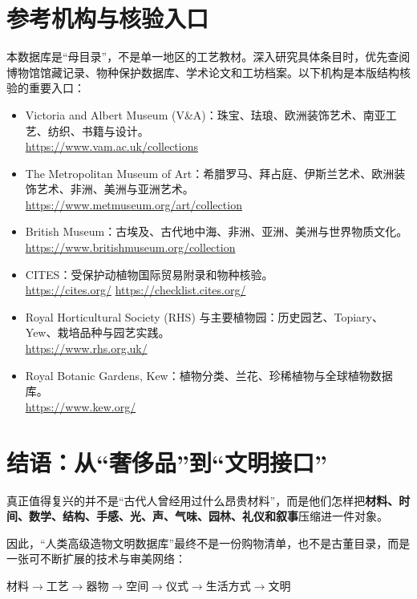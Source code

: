 \documentclass[lang=en,a4paper,11pt]{elegantpaper}
\begin{document}
\section{参考机构与核验入口}



本数据库是“母目录”，不是单一地区的工艺教材。深入研究具体条目时，优先查阅博物馆馆藏记录、物种保护数据库、学术论文和工坊档案。以下机构是本版结构核验的重要入口：
\begin{itemize}
\item Victoria and Albert Museum (V\&A)：珠宝、珐琅、欧洲装饰艺术、南亚工艺、纺织、书籍与设计。\\
\url{https://www.vam.ac.uk/collections}
\item The Metropolitan Museum of Art：希腊罗马、拜占庭、伊斯兰艺术、欧洲装饰艺术、非洲、美洲与亚洲艺术。\\
\url{https://www.metmuseum.org/art/collection}
\item British Museum：古埃及、古代地中海、非洲、亚洲、美洲与世界物质文化。\\
\url{https://www.britishmuseum.org/collection}
\item CITES：受保护动植物国际贸易附录和物种核验。\\
\url{https://cites.org/} \quad \url{https://checklist.cites.org/}
\item Royal Horticultural Society (RHS) 与主要植物园：历史园艺、Topiary、Yew、栽培品种与园艺实践。\\
\url{https://www.rhs.org.uk/}
\item Royal Botanic Gardens, Kew：植物分类、兰花、珍稀植物与全球植物数据库。\\
\url{https://www.kew.org/}
\end{itemize}

\section{结语：从“奢侈品”到“文明接口”}



真正值得复兴的并不是“古代人曾经用过什么昂贵材料”，而是他们怎样把\textbf{材料、时间、数学、结构、手感、光、声、气味、园林、礼仪和叙事}压缩进一件对象。

因此，“人类高级造物文明数据库”最终不是一份购物清单，也不是古董目录，而是一张可不断扩展的技术与审美网络：

\begin{manifesto}[总公式]
\centering
\Large
$\boxed{\text{材料}\rightarrow\text{工艺}\rightarrow\text{器物}\rightarrow\text{空间}\rightarrow\text{仪式}\rightarrow\text{生活方式}\rightarrow\text{文明}}$
\end{manifesto}
\end{document}
